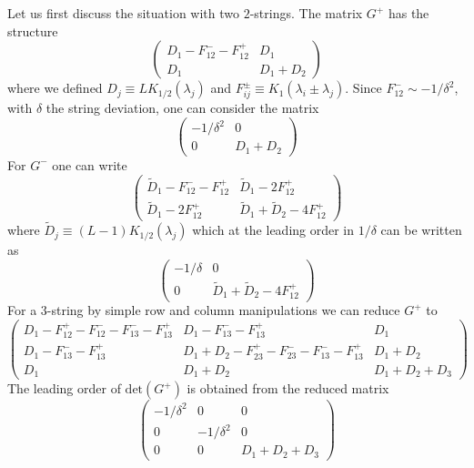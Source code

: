 \documentclass[onecolumn,superscriptaddress,pr]{revtex4}
\begin{document}
Let us first discuss the situation with two $2$-strings. 
The matrix $G^+$ has the structure 
%
\begin{equation}
\left(\begin{array}{cc}
D_1-F^-_{12}-F^+_{12} & D_1\\
D_1 & D_1+D_2
\end{array}
\right)
\end{equation}
% 
where we defined $D_j\equiv LK_{1/2}(\lambda_j)$ and $F^{\pm}_{ij}\equiv K_1(\lambda_i\pm\lambda_j)$.
Since $F^-_{12}\sim -1/\delta^2$, with $\delta$ the string deviation, one can consider the matrix 
%
\begin{equation}
\left(\begin{array}{cc}
-1/\delta^2 & 0\\
0 & D_1+D_2
\end{array}
\right)
\end{equation}
% 
For $G^-$ one can write
%
\begin{equation}
\left(\begin{array}{cc}
\tilde D_1-F^-_{12}-F^+_{12} & \tilde D_1-2F_{12}^+\\
\tilde D_1 -2F_{12}^+ & \tilde D_1+\tilde D_2-4F_{12}^+
\end{array}
\right)
\end{equation}
% 
where $\tilde D_j\equiv (L-1)K_{1/2}(\lambda_j)$
which at the leading order in $1/\delta$ can be written as 
%
\begin{equation}
\left(\begin{array}{cc}
-1/\delta & 0\\
0 & \tilde D_1+\tilde D_2-4F_{12}^+
\end{array}
\right)
\end{equation}
% 
For a $3$-string by simple row and column manipulations we can reduce $G^+$ to 
%
\begin{equation}
\left(\begin{array}{ccc}
D_1-F_{12}^+-F_{12}^--F_{13}^--F_{13}^+ & D_1-F_{13}^--F_{13}^+ & D_1\\
D_1-F_{13}^--F_{13}^+ & D_1+D_2-F_{23}^+-F_{23}^--F_{13}^--F_{13}^+ & D_1+D_2\\
D_1 & D_1+D_2 & D_1+D_2+D_3
\end{array}
\right)
\end{equation}
% 
The leading order of $\textrm{det}(G^+)$ is obtained from the reduced matrix 
%
\begin{equation}
\left(\begin{array}{ccc}
-1/\delta^2 & 0 & 0\\
0 & -1/\delta^2 & 0 \\
0 & 0 & D_1+D_2+D_3
\end{array}
\right)
\end{equation}
\end{document}
